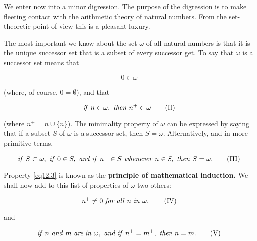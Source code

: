 We enter now into a minor digression. The purpose of the digression is to make fleeting contact with the arithmetic theory of natural numbers. From the set-theoretic point of view this is a pleasant luxury. 

The most important we know about the set $\omega$ of all natural numbers is that it is the unique successor set that is a subset of every successor get. To say that $\omega$ is a successor set means that

\begin{equation}
\label{eq12.1}
0 \in \omega \tag{I}
\end{equation}

(where, of course, $0 = \emptyset$), and that 

\begin{equation}
\label{eq12.2}
\text{\textit{if} } n \in\omega, \text{ \textit{then} } n^{+} \in \omega \tag{II}
\end{equation}

(where $n^{+} = n \cup \{ n \}$). The minimality property of $\omega$ can be expressed by saying that if a subset $S$ of $\omega$ is a successor set, then $S = \omega$. Alternatively, and in more primitive terms,

\begin{equation}
\label{eq12.3}
\text{\textit{if} } S \subset \omega, \text{ \textit{if} } 0 \in S, \text{ \textit{and if} } n^{+} \in S \text{ \textit{whenever} } n \in S, \text{ \textit{then} } S = \omega . \tag{III}
\end{equation}

Property \eqref{eq12.3} is known as the \textbf{principle of mathematical induction.} We shall now add to this list of properties of $\omega$ two others: 

\begin{equation}
\label{eq12.4}
n^{+} \neq 0 \text{ \textit{for all} } n \text{ \textit{in} } \omega , \tag{IV}
\end{equation}

and

\begin{equation}
\label{eq12.5}
\text{\textit{if} } n \text{ \textit{and} } m \text{ \textit{are in} } \omega , \text{ \textit{and if} } n^{+} = m^{+} , \text{ \textit{then} } n = m.\tag{V}
\end{equation}

